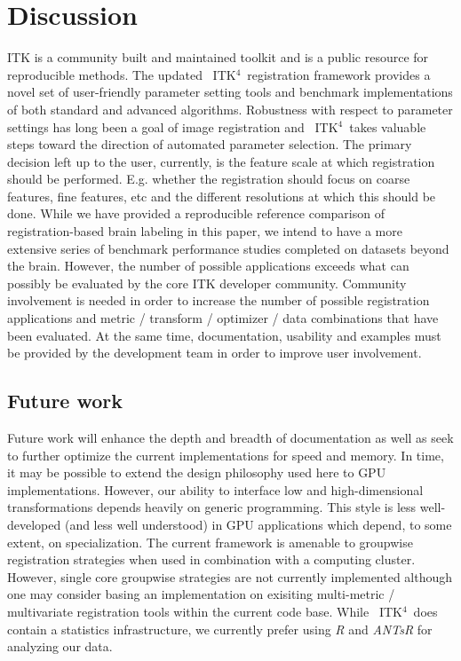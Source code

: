 \documentclass{frontiersSCNS}
\newcommand{\tk}{~ITK$^{\text{4}}$~}
\begin{document}
\section{Discussion} 
ITK is a community built and maintained toolkit and is a public
resource for reproducible methods.  The updated \tk registration
framework provides a novel set of user-friendly parameter setting
tools and benchmark implementations of both standard and advanced
algorithms.  Robustness with respect to parameter settings has long
been a goal of image registration and \tk takes valuable steps toward
the direction of automated parameter selection.  The primary decision
left up to the user, currently, is the feature scale at which
registration should be performed.  E.g. whether the registration should focus on coarse features, fine
features, etc and the different resolutions at which this should be
done.  While we have provided a reproducible reference comparison of
registration-based brain labeling in this paper, we intend to have a more extensive series of benchmark performance studies
completed on datasets beyond the brain.  However, the number of
possible applications exceeds what can possibly be evaluated by the
core ITK developer community.  Community involvement is needed in order to increase the
number of possible registration applications and metric / transform /
optimizer / data combinations that have been evaluated.  At the same
time, documentation, usability and examples must be provided by the
development team in order to improve user involvement.  


\subsection{Future work}
Future work will enhance the depth and breadth of documentation as well as
seek to further optimize the current implementations for speed and memory.
In time, it may be possible to extend the design philosophy used here
to GPU implementations.  However, our ability to  interface low and
high-dimensional transformations depends heavily on generic
programming.  This style is less well-developed (and less well understood) in
GPU applications which depend, to some extent, on specialization. 
The current framework is amenable to groupwise registration strategies
when used in combination with a computing cluster.  However, single
core groupwise strategies are not currently implemented although one
may consider basing an implementation on exisiting multi-metric /
multivariate registration tools within the current code base.  While
\tk does contain a statistics infrastructure, we currently prefer
using \textit{R} and \textit{ANTsR} for analyzing our data.  
\end{document}
